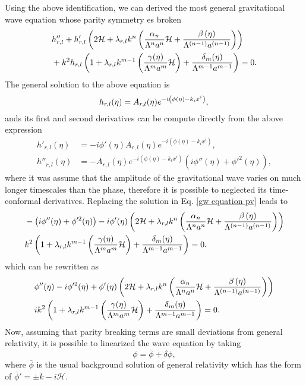 \documentclass{article}
\begin{document}
Using the above identification, we can derived the most general gravitational wave equation
whose parity symmetry es broken
\begin{align}
    & h''_{r,l} + h'_{r,l}\left(2\mathcal{H} + \lambda_{r,l}k^{n}
    \left(\frac{\alpha_{n}}{\Lambda^n a^n}\mathcal{H} + 
    \frac{\beta\left(\eta\right)}{\Lambda^{(n-1)}a^{(n-1)}}\right)\right) \notag \\ 
    & + k^2 h_{r,l}\left(1 + \lambda_{r,l}k^{m-1}
    \left(\frac{\gamma(\eta)}{\Lambda^m a^m}\mathcal{H}\right) 
    + \frac{\delta_{m}(\eta)}{\Lambda^{m-1}a^{m-1}}\right) = 0.
\end{align}
The general solution to the above equation is
\begin{equation}
    h_{r,l}(\eta)  = A_{r,l}(\eta)e^{-i\left(\phi(\eta) -k_{i}x^{i}\right)}, \\
\end{equation} 
ands its first and second derivatives can be compute directly from the above expression 
\begin{align}
    h'_{r,l}(\eta) & = -i\phi'(\eta)A_{r,l}(\eta)e^{-i\left(\phi(\eta) -k_{i}x^{i}\right)}, \\
    h''_{r,l}(\eta) & = -A_{r,l}(\eta)e^{-i\left(\phi(\eta) -k_{i}x^{i}\right)} 
    \left(i\phi''(\eta) + \phi'^{2}(\eta)\right),
\end{align} 
where it was assume that the amplitude of the gravitational wave varies 
on much longer timescales than the phase, therefore it is possible to neglected its 
time-conformal derivatives. Replacing the solution in Eq. \eqref{gw equation pv} leads to
\begin{align}
    & -\left(i\phi''(\eta) + \phi'^{2}(\eta)\right) -i\phi'(\eta)
    \left(2\mathcal{H} + \lambda_{r,l}k^{n}
    \left(\frac{\alpha_{n}}{\Lambda^n a^n}\mathcal{H} + 
    \frac{\beta\left(\eta\right)}{\Lambda^{(n-1)}a^{(n-1)}}\right)\right) \notag \\
    & k^2 \left(1 + \lambda_{r,l}k^{m-1}
    \left(\frac{\gamma(\eta)}{\Lambda^m a^m}\mathcal{H}\right) 
    + \frac{\delta_{m}(\eta)}{\Lambda^{m-1}a^{m-1}}\right) = 0.
\end{align}
which can be rewritten as
\begin{align}
    & \phi''(\eta) - i\phi'^{2}(\eta) + \phi'(\eta)
    \left(2\mathcal{H} + \lambda_{r,l}k^{n}
    \left(\frac{\alpha_{n}}{\Lambda^n a^n}\mathcal{H} + 
    \frac{\beta\left(\eta\right)}{\Lambda^{(n-1)}a^{(n-1)}}\right)\right) \notag \\
    & i k^2 \left(1 + \lambda_{r,l}k^{m-1}
    \left(\frac{\gamma(\eta)}{\Lambda^m a^m}\mathcal{H}\right) 
    + \frac{\delta_{m}(\eta)}{\Lambda^{m-1}a^{m-1}}\right) = 0.
\end{align}
Now, assuming that parity breaking terms are small deviations from general relativity,
it is possible to linearized the wave equation by taking
\begin{equation}
    \phi = \bar{\phi} + \delta \phi,
\end{equation}
where $\bar{\phi}$ is the usual background solution of general relativity which has 
the form of $\bar{\phi} ' = \pm k - i\mathcal{H}$.



\end{document}
